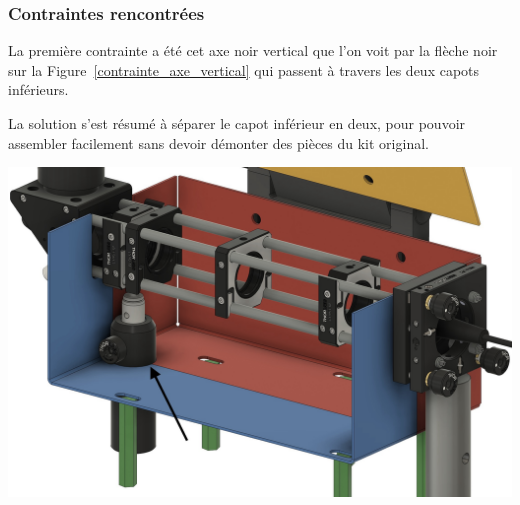 \subsubsection{Contraintes rencontrées}

\begin{minipage}[c]{0.4\textwidth}
    La première contrainte a été cet axe noir vertical que l'on voit par la flèche noir sur la Figure~\ref{contrainte_axe_vertical} qui passent à travers les deux capots inférieurs.

    La solution s'est résumé à séparer le capot inférieur en deux, pour pouvoir assembler facilement sans devoir démonter des pièces du kit original.
\end{minipage}\hfill
\begin{minipage}[c]{0.58\textwidth}
    \begin{center}
        \includegraphics[width=\textwidth]{assets/figures/Protections_laser/Securite_mecanique/Protection_entree_laser/contrainte_axe_vertical.jpeg}
    \end{center}
    \label{contrainte_axe_vertical}
\end{minipage}

